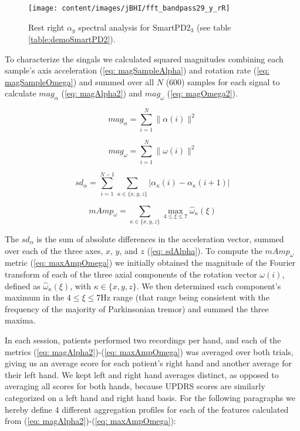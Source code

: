 \begin{figure}[h]
	\centering
	\texttt{[image: content/images/jBHI/fft\_bandpass29\_y\_rR]}
	\caption{Rest right $\alpha_{y}$ spectral analysis for \gls{SmartPD2}$_{3}$ (see table \ref{table:demoSmartPD2}).}
	\label{fig:accelFFTPD2_3}
\end{figure}

To characterize the singals we calculated squared magnitudes combining each sample's axis acceleration (\ref{eq: magSampleAlpha}) and rotation rate (\ref{eq: magSampleOmega}) and summed over all $N$ (600) samples for each signal to calculate $mag_{\alpha}$ (\ref{eq: magAlpha2}) and $mag_{\omega}$ (\ref{eq: magOmega2}).


\begin{equation} \label{eq: magAlpha2}
mag_{\alpha} = \sum_{i=1}^{N} \|\alpha(i)\|^{2}
\end{equation}

\begin{equation} \label{eq: magOmega2}
mag_{\omega} = \sum_{i=1}^{N} \|\omega(i)\|^{2}
\end{equation}

\begin{equation} \label{eq: sdAlpha}
sd_{\alpha} = \sum_{i=1}^{N-1}\sum_{\kappa \in \{x,y,z\}} |\alpha_{\kappa}(i) - \alpha_{\kappa}(i+1)|
\end{equation}

\begin{equation} \label{eq: maxAmpOmega}
mAmp_{\omega} = \sum_{\kappa \in \{x,y,z\}} \max_{4 \leq \xi \leq 7} \hat{\omega}_{\kappa}(\xi)
\end{equation}

\noindent
The $sd_{\alpha}$ is the sum of absolute differences in the acceleration vector, summed over each of the three axes, $x$, $y$, and $z$ (\ref{eq: sdAlpha}). To compute the $mAmp_{\omega}$ metric (\ref{eq: maxAmpOmega}) we initially obtained the magnitude of the Fourier transform of each of the three axial components of the rotation vector $\omega(i)$, defined as $\hat{\omega}_{\kappa}(\xi)$, with $\kappa \in \{x,y,z\}$. We then determined each component’s maximum in the $4 \leq \xi \leq 7$Hz range (that range being consistent with the frequency of the majority of Parkinsonian tremor) and summed the three maxima. 

In each session, patients performed two recordings per hand, and each of the metrics (\ref{eq: magAlpha2})-(\ref{eq: maxAmpOmega}) was averaged over both trials, giving us an average score for each patient's right hand and another average for their left hand. We kept left and right hand averages distinct, as opposed to averaging all scores for both hands, because \gls{UPDRS} scores are similarly categorized on a left hand and right hand basis. For the following paragraphs we hereby define 4 different aggregation profiles for each of the features calculated from (\ref{eq: magAlpha2})-(\ref{eq: maxAmpOmega}):


